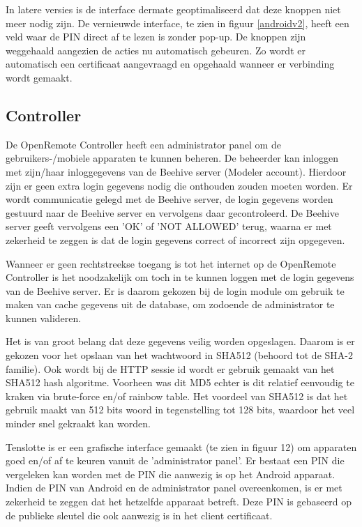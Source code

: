 \documentclass[]{article}
\begin{document}
In latere versies is de interface dermate geoptimaliseerd dat deze knoppen niet
meer nodig zijn. De vernieuwde interface, te zien in figuur \ref{androidv2}, heeft een
veld waar de PIN direct af te lezen is zonder pop-up. De knoppen zijn weggehaald
aangezien de acties nu automatisch gebeuren. Zo wordt er automatisch een
certificaat aangevraagd en opgehaald wanneer er verbinding wordt gemaakt. 

\subsection{Controller}
De OpenRemote Controller heeft een administrator panel om de gebruikers-/mobiele
apparaten te kunnen beheren. De beheerder kan inloggen met zijn/haar
inloggegevens van de Beehive server (Modeler account). Hierdoor zijn er geen
extra login gegevens nodig die onthouden zouden moeten worden. Er wordt communicatie
gelegd met de Beehive server, de login gegevens worden gestuurd naar de Beehive server
en vervolgens daar gecontroleerd. De Beehive server geeft vervolgens een 'OK'
of 'NOT ALLOWED' terug, waarna er met zekerheid te zeggen is dat de login gegevens
correct of incorrect zijn opgegeven.

Wanneer er geen rechtstreekse toegang is tot het internet op de 
OpenRemote Controller is het noodzakelijk om toch in te kunnen loggen met de
login gegevens van de Beehive server. Er is daarom gekozen bij de login module
om gebruik te maken van cache gegevens uit de database, om zodoende de administrator te
kunnen valideren.

Het is van groot belang dat deze gegevens veilig worden opgeslagen. Daarom is er
gekozen voor het opslaan van het wachtwoord in SHA512 (behoord tot de SHA-2
familie). Ook wordt bij de HTTP sessie id  wordt er gebruik gemaakt van het SHA512
hash algoritme. Voorheen was dit MD5 echter is dit relatief
eenvoudig te kraken via brute-force en/of rainbow table. Het voordeel van SHA512
is dat het gebruik maakt van 512 bits woord in tegenstelling tot 128
bits, waardoor het veel minder snel gekraakt kan worden.

Tenslotte is er een grafische interface gemaakt (te zien in figuur 12) om
apparaten goed en/of af te keuren vanuit de 'administrator panel'. Er bestaat
een PIN die vergeleken kan worden met de PIN die aanwezig is op het Android
apparaat. Indien de PIN van Android en de administrator panel overeenkomen, is
er met zekerheid te zeggen dat het hetzelfde apparaat betreft. Deze PIN is
gebaseerd op de publieke sleutel die ook aanwezig is in het client certificaat.
\end{document}

